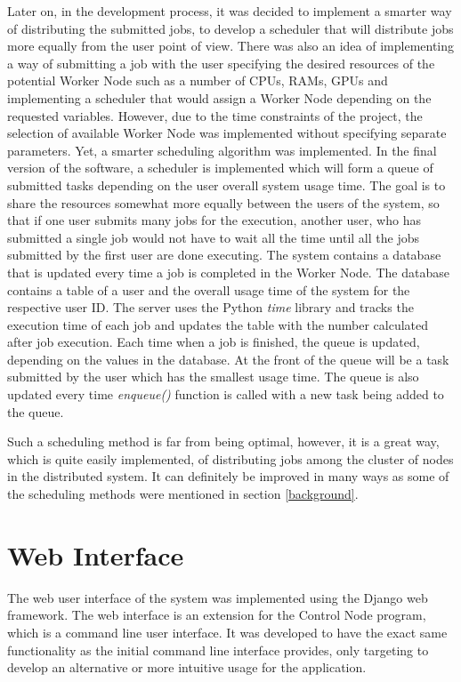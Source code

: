 \documentclass[10pt]{report}
\begin{document}
Later on, in the development process, it was decided to implement a smarter way of distributing the submitted jobs, to develop a scheduler that will distribute jobs more equally from the user point of view. There was also an idea of implementing a way of submitting a job with the user specifying the desired resources of the potential Worker Node such as a number of CPUs, RAMs, GPUs and implementing a scheduler that would assign a Worker Node depending on the requested variables. However, due to the time constraints of the project, the selection of available Worker Node was implemented without specifying separate parameters. Yet, a smarter scheduling algorithm was implemented. In the final version of the software, a scheduler is implemented which will form a queue of submitted tasks depending on the user overall system usage time. The goal is to share the resources somewhat more equally between the users of the system, so that if one user submits many jobs for the execution, another user, who has submitted a single job would not have to wait all the time until all the jobs submitted by the first user are done executing. The system contains a database that is updated every time a job is completed in the Worker Node. The database contains a table of a user and the overall usage time of the system for the respective user ID. The server uses the Python \textit{time} library and tracks the execution time of each job and updates the table with the number calculated after job execution. Each time when a job is finished, the queue is updated, depending on the values in the database. At the front of the queue will be a task submitted by the user which has the smallest usage time. The queue is also updated every time \textit{enqueue()} function is called with a new task being added to the queue.
\newline

Such a scheduling method is far from being optimal, however, it is a great way, which is quite easily implemented, of distributing jobs among the cluster of nodes in the distributed system. It can definitely be improved in many ways as some of the scheduling methods were mentioned in section \ref{background}.

\section{Web Interface}

The web user interface of the system was implemented using the Django web framework. The web interface is an extension for the Control Node program, which is a command line user interface. It was developed to have the exact same functionality as the initial command line interface provides, only targeting to develop an alternative or more intuitive usage for the application.
\newline
\end{document}
